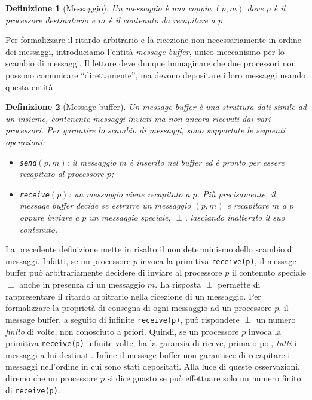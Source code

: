 \documentclass{article}
\newtheorem{definizione}{Definizione}
\begin{document}
\begin{definizione}[Messaggio]
  Un messaggio è una coppia $(p,m)$ dove $p$ è il processore
  destinatario e $m$ è il contenuto da recapitare a $p$.
\end{definizione}

Per formalizzare il ritardo arbitrario e la ricezione non
necessariamente in ordine dei messaggi, introduciamo l'entità
\emph{message buffer}, unico meccanismo per lo scambio di messaggi. Il
lettore deve dunque immaginare che due processori non possono
comunicare ``direttamente'', ma devono depositare i loro messaggi
usando questa entità.

\begin{definizione}[Message buffer]
  Un \emph{message buffer} è una struttura dati simile ad un insieme,
  contenente messaggi inviati ma non ancora ricevuti dai vari
  processori. Per garantire lo scambio di messaggi, sono supportate le
  seguenti operazioni:
\begin{itemize}
\item \texttt{send$(p,m)$}: il messaggio $m$ è inserito nel buffer ed
  è pronto per essere recapitato al processore $p$;
\item \texttt{receive$(p)$}: un messaggio viene recapitato a $p$. Più
  precisamente, il message buffer decide se estrarre un messaggio
  $(p,m)$ e recapitare $m$ a $p$ oppure inviare a $p$ un messaggio speciale,
  $\perp$, lasciando inalterato il suo contenuto.
\end{itemize}
\end{definizione}
La precedente definizione mette in risalto il non determinismo dello
scambio di messaggi. Infatti, se un processore $p$ invoca la primitiva
\texttt{receive(p)}, il message buffer può arbitrariamente decidere di
inviare al processore $p$ il contenuto speciale $\perp$ anche in
presenza di un messaggio $m$. La risposta $\perp$ permette di
rappresentare il ritardo arbitrario nella ricezione di un
messaggio. Per formalizzare la proprietà di consegna di ogni
messaggio ad un processore $p$, il message buffer, a seguito di infinite
\texttt{receive(p)}, può rispondere $\perp$ un numero \emph{finito} di
volte, non conosciuto a priori. Quindi, se un processore $p$ invoca la
primitiva \texttt{receive(p)} infinite volte, ha la garanzia di
riceve, prima o poi, \emph{tutti} i messaggi a lui destinati. Infine
il message buffer non garantisce di recapitare i messaggi nell'ordine
in cui sono stati depositati. Alla luce di queste osservazioni, diremo
che un processore $p$ si dice guasto se può effettuare solo un numero
finito di \texttt{receive(p)}.
\end{document}

